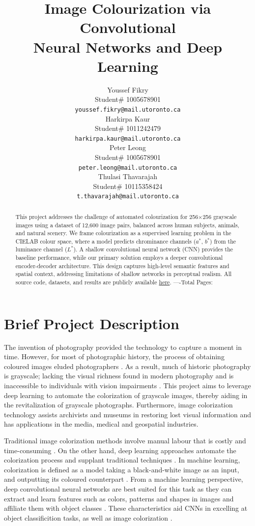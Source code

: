 \documentclass{article} %
\title{Image Colourization via Convolutional \\
Neural Networks and Deep Learning}
\author{Youssef Fikry  \\
Student\# 1005678901\\
\texttt{youssef.fikry@mail.utoronto.ca} \\
\And Harkirpa Kaur  \\
Student\# 1011242479 \\
\texttt{harkirpa.kaur@mail.utoronto.ca} \\
\AND
Peter Leong \\
Student\# 1005678901 \\
\texttt{peter.leong@mail.utoronto.ca} \\
\And
Thulasi Thavarajah \\
Student\# 10115358424 \\
\texttt{t.thavarajah@mail.utoronto.ca} \\
\AND
}
\begin{document}
\maketitle

\begin{abstract}
This project addresses the challenge of automated colourization for 256$\times$256 grayscale images using a dataset of 12,600 image pairs, balanced across human subjects, 
animals, and natural scenery. We frame colourization as a supervised learning problem in the CIELAB colour space, where a model predicts chrominance channels ($a^*$, $b^*$) 
from the luminance channel ($L^*$). A shallow convolutional neural network (CNN) provides the baseline performance, while our primary solution employs a deeper convolutional encoder-decoder architecture. This 
design captures high-level semantic features and spatial context, addressing limitations of shallow networks in perceptual realism. All source code, datasets, and results 
are publicly available \href{https://drive.google.com/drive/folders/1cV1NhlQ8UTk_CgJdwhqeRu0z5xE85ZsI?usp=sharing}{here}. 
----Total Pages: \pageref{last_page}
\end{abstract}


\section{Brief Project Description}

The invention of photography provided the technology to capture a moment in time. However, for most of photographic history, the process of obtaining coloured images eluded photographers \citep{scienceandmediamuseum2020}. As a result, much of historic photography is grayscale; lacking the visual richness found in modern photography and is inaccessible to individuals with vision impairments \citep{vogelsang2024impact}. This project aims to leverage deep learning to automate the colorization of grayscale images, thereby aiding in the revitalization of grayscale photographs. Furthermore, image colorization technology assists archivists and museums in restoring lost visual information and has applications in the media, medical and geospatial industries. 

Traditional image colorization methods involve manual labour that is costly and time-consuming \citep{farella2022}. On the other hand, deep learning approaches automate the colorization process and supplant traditional techniques \citep{farella2022}. In machine learning, colorization is defined as a model taking a black-and-white image as an input, and outputting its coloured counterpart \citep{lettherebecolor}. From a machine learning perspective, deep convolutional neural networks are best suited for this task as they can extract and learn features such as colors, patterns and shapes in images and affiliate them with object classes \citep{deepcnn}. These characteristics aid CNNs in excelling at object classificition tasks, as well as image colorization \citep{deepcnn}. 
\end{document}
